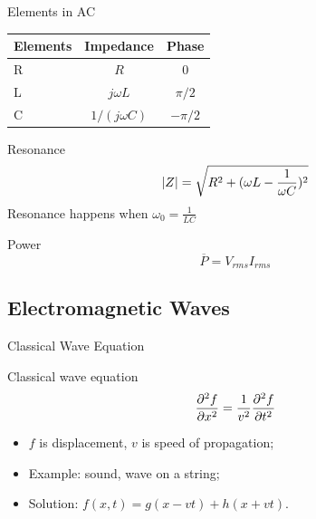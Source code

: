 \documentclass{beamer}
\begin{document}
\begin{frame}{Elements in AC}
    \begin{table}[htbp]
        \centering
        \begin{tabular}{l c c}
            \toprule
            Elements & Impedance        & Phase    \\
            \midrule
            R        & $R$              & 0        \\
            L        & $j\omega L $     & $\pi/2$  \\
            C        & $1/(j \omega C)$ & $-\pi/2$ \\
            \bottomrule
        \end{tabular}
    \end{table}

    \begin{block}{Resonance}
        \begin{equation}
            \abs{Z} = \sqrt{R^2+(\omega L - \frac{1}{\omega C})^2 }
        \end{equation}
        Resonance happens when $\omega_0 = \frac{1}{LC}$
    \end{block}

    \begin{block}{ Power}
        \begin{equation}
            \overline{P} = V_{rms} I_{rms}
        \end{equation}
    \end{block}
\end{frame}

\subsection{Electromagnetic Waves}

\begin{frame}{Classical Wave Equation}
    \begin{block}{Classical wave equation}
        \begin{equation}
            \pdv[2]{f}{x} = \frac{1}{v^2} \pdv[2]{f}{t}
        \end{equation}
    \end{block}
    \vfill
    \begin{itemize}
        \item $f$ is displacement, $v$ is speed of propagation;
        \item Example: sound, wave on a string;
        \item Solution: $f(x, t) = g(x - vt) + h(x + vt)$.
    \end{itemize}
\end{frame}
\end{document}
